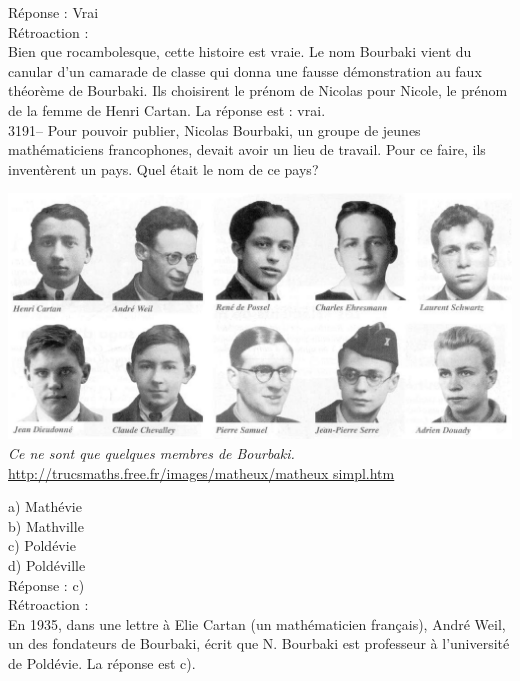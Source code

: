 \documentclass[letterpaper, 12pt]{article}
\begin{document}
R\'eponse : Vrai\\

R\'etroaction :\\
Bien que rocambolesque, cette histoire est vraie. Le nom Bourbaki vient du canular d'un camarade de classe qui donna une fausse d\'emonstration au faux th\'eor\`eme de Bourbaki. Ils choisirent le pr\'enom de Nicolas pour Nicole, le pr\'enom de la femme de Henri Cartan. La r\'eponse est : vrai.\\



3191-- Pour pouvoir publier, Nicolas Bourbaki, un groupe de jeunes math\'ematiciens francophones, devait avoir un lieu de travail. Pour ce faire, ils invent\`erent un pays.  Quel \'etait le nom de ce pays?\\
\begin{center}
\includegraphics[scale=0.25]{bourbaki.eps}\\
\emph{{\small Ce ne sont que quelques membres de Bourbaki.}}\\
\href{http://trucsmaths.free.fr/images/matheux/matheux_simpl.htm#B}{http://trucsmaths.free.fr/images/matheux/matheux simpl.htm}\\
\end{center}

a) Math\'evie\\
b) Mathville\\
c) Pold\'evie\\
d) Pold\'eville\\

R\'eponse : c)\\

R\'etroaction :\\
En 1935, dans une lettre \`a Elie Cartan (un math\'ematicien fran\c cais), Andr\'e Weil, un des fondateurs de Bourbaki, \'ecrit que N. Bourbaki est professeur \`a l'universit\'e de Pold\'evie. La r\'eponse est c).\\
\end{document}
